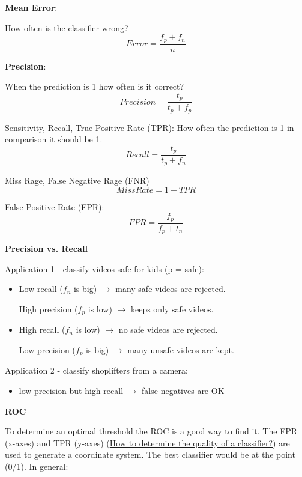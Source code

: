 \documentclass[11pt,landscape]{article}
\begin{document}
\begin{multicols}{3}
\textbf{Mean Error}:

How often is the classifier wrong?
\begin{equation}
Error = \frac{f_p + f_n}{n}
\end{equation}

\textbf{Precision}:

When the prediction is 1 how often is it correct?
\begin{equation}
Precision = \frac{t_p}{t_p + f_p}
\end{equation}

Sensitivity, Recall, True Positive Rate (TPR): How often the prediction is 1 in comparison it should be 1.
\begin{equation}
Recall = \frac{t_p}{t_p + f_n}
\end{equation}

Miss Rage, False Negative Rage (FNR)
\begin{equation}
Miss Rate = 1 - TPR
\end{equation}

False Positive Rate (FPR):
\begin{equation}
FPR = \frac{f_p}{f_p + t_n}
\end{equation}


\textbf{Precision vs. Recall}

Application 1 - classify videos safe for kids (p = safe):
\begin{itemize}
\item Low recall (\(f_n\) is big) \(\rightarrow\) many safe videos are rejected.

High precision (\(f_p\) is low) \(\rightarrow\) keeps only safe videos.

\item High recall (\(f_n\) is low) \(\rightarrow\) no safe videos are rejected.

Low precision (\(f_p\) is big) \(\rightarrow\) many unsafe videos are kept.
\end{itemize}


Application 2 - classify shoplifters from a camera:
\begin{itemize}
\item low precision but high recall \(\rightarrow\) false negatives are OK
\end{itemize}


\textbf{ROC}

To determine an optimal threshold the ROC is a good way to find it.
The FPR (x-axes) and TPR (y-axes) (\href{../../../roam/20211227105842-how_to_determine_the_quality_of_a_classifier.org}{How to determine the quality of a classifier?}) are used to generate a coordinate system. 
The best classifier would be at the point (0/1).
In general:


\end{multicols}
\end{document}
